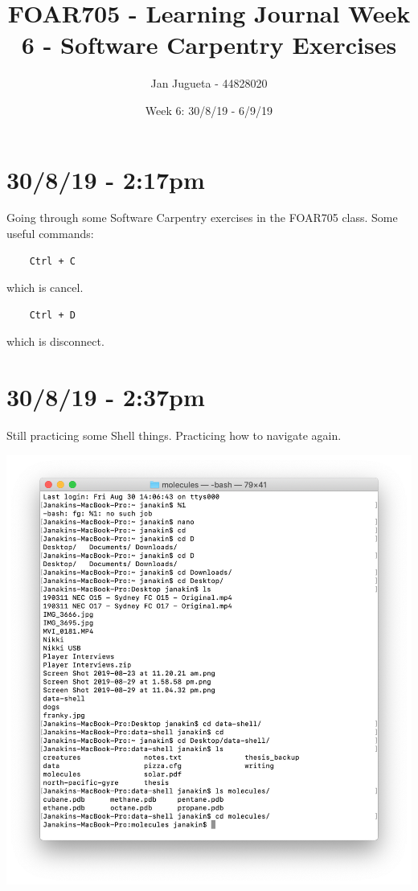\documentclass{article}
\title{FOAR705 - Learning Journal Week 6 - Software Carpentry Exercises}
\author{Jan Jugueta - 44828020}
\date{Week 6: 30/8/19 - 6/9/19}
\begin{document}
\maketitle

\section*{30/8/19 - 2:17pm}

Going through some Software Carpentry exercises in the FOAR705 class. Some useful commands:

\begin{verbatim}
    Ctrl + C 
\end{verbatim}
which is cancel.

\begin{verbatim}
    Ctrl + D
\end{verbatim}
which is disconnect.

\section*{30/8/19 - 2:37pm}

Still practicing some Shell things. Practicing how to navigate again.

\includegraphics[width=\textwidth]{figa.png}
\end{document}
